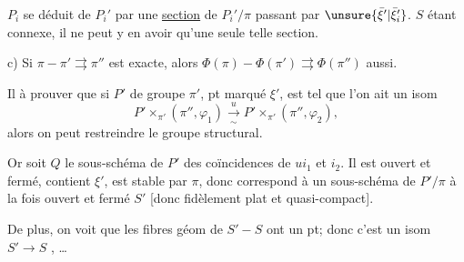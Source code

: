  $P_i$ se déduit de $P_i'$ par une \uline{section} de $P_i'/\pi$ passant par $\unsure{\bar\xi'|\bar\xi_i'}$. $S$ étant connexe, il ne peut y en avoir qu'une seule telle section.

c) Si $\pi\mathbin{-}\pi'\rightrightarrows\pi''$ est exacte, alors \deleted{$\unsure{\Pi|\Phi}$} $\Phi(\pi)\mathbin{-}\Phi(\pi')\rightrightarrows\Phi(\pi'')$ aussi.

Il  à prouver que si $P'$ de groupe $\pi'$, pt marqué $\xi'$, est tel que  l'on ait un isom
\[
P'\times_{\pi'}(\pi'',\varphi_1)\xrightarrow[\sim]{u}
P'\times_{\pi'}(\pi'',\varphi_2),
\]
alors on peut restreindre le groupe structural.

Or soit $Q$ le sous-schéma de $P'$ des coïncidences de $u i_1$ et $i_2$. Il est ouvert et fermé, contient $\xi'$, est stable par $\pi$, donc correspond à un sous-schéma de $P'/\pi$ à la fois ouvert et fermé $S'$ [donc  fidèlement plat et quasi-compact].


De plus, on voit que les  fibres géom de $S'\mathbin{-}S$ ont  un pt; donc c'est un isom $S'\to S$ , \ldots
